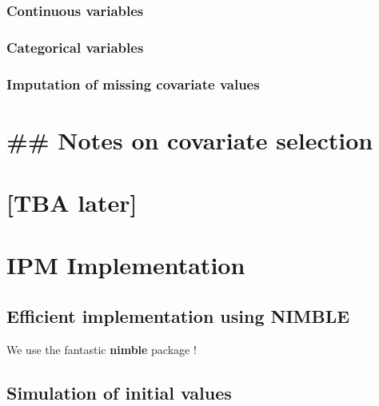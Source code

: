 \documentclass[
]{book}
\begin{document}
\hypertarget{continuous-variables}{%
\subsection{Continuous variables}\label{continuous-variables}}

\hypertarget{categorical-variables}{%
\subsection{Categorical variables}\label{categorical-variables}}

\hypertarget{imputation-of-missing-covariate-values}{%
\subsection{Imputation of missing covariate values}\label{imputation-of-missing-covariate-values}}

\hypertarget{notes-on-covariate-selection}{%
\chapter{\#\# Notes on covariate selection}\label{notes-on-covariate-selection}}

\hypertarget{tba-later}{%
\chapter{{[}TBA later{]}}\label{tba-later}}

\hypertarget{IPMImp}{%
\chapter{IPM Implementation}\label{IPMImp}}

\hypertarget{efficient-implementation-using-nimble}{%
\section{Efficient implementation using NIMBLE}\label{efficient-implementation-using-nimble}}

We use the fantastic \textbf{nimble} package \citep{devalpine2017}!

\hypertarget{simulation-of-initial-values}{%
\section{Simulation of initial values}\label{simulation-of-initial-values}}
\end{document}
